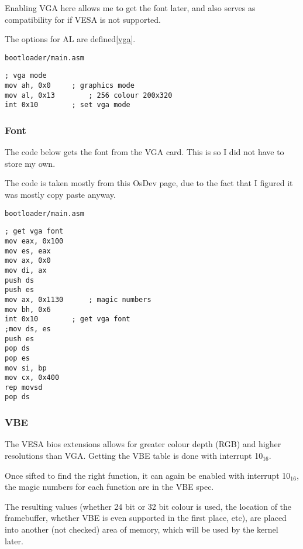 \documentclass{article}
\begin{document}
Enabling VGA\cite{vga} here allows me to get the font later,
and also serves as compatibility for if VESA is not supported.

The options for AL are defined\ref{vga}.

\begin{verbatim}
bootloader/main.asm
\end{verbatim}
\begin{verbatim}
; vga mode
mov ah, 0x0		; graphics mode
mov al, 0x13		; 256 colour 200x320
int 0x10		; set vga mode
\end{verbatim}

\subsubsection{Font}

The code below gets the font from the VGA card. This
is so I did not have to store my own.

The code is taken mostly from this OsDev page\cite{get vga font},
due to the fact that I figured it was mostly copy paste anyway.

\begin{verbatim}
bootloader/main.asm
\end{verbatim}
\begin{verbatim}
; get vga font
mov eax, 0x100
mov es, eax
mov ax, 0x0
mov di, ax
push ds
push es
mov ax, 0x1130		; magic numbers
mov bh, 0x6
int 0x10		; get vga font
;mov ds, es
push es
pop ds
pop es
mov si, bp
mov cx, 0x400
rep movsd
pop ds
\end{verbatim}

\subsubsection{VBE}

The VESA bios extensions allows for greater colour depth (RGB) and higher
resolutions than VGA. Getting the VBE table is done with interrupt 10$_{16}$\cite{vbe}.

Once sifted to find the right function, it can again be enabled with
interrupt 10$_{16}$, the magic numbers for each function are in the
VBE spec\cite{vbe}.

The resulting values (whether 24 bit or 32 bit colour is used, the location of
the framebuffer, whether VBE is even supported in the first place, etc), are placed
into another (not checked) area of memory, which will be used by the kernel later.
\end{document}
